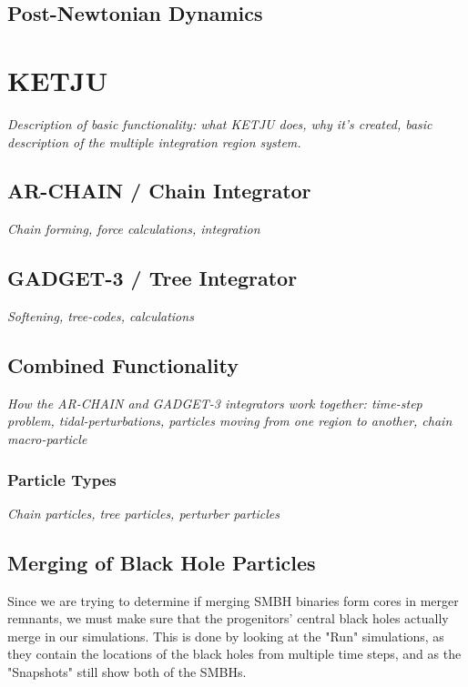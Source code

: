 \documentclass[english, oneside]{HYgradu}
\begin{document}
\section{Post-Newtonian Dynamics}

\chapter{KETJU}

\textit{Description of basic functionality: what KETJU does, why it's created, basic description of the multiple integration region system.} 

\section{AR-CHAIN / Chain Integrator}

\textit{Chain forming, force calculations, integration}

\section{GADGET-3 / Tree Integrator}

\textit{Softening, tree-codes, calculations}

\section{Combined Functionality}

\textit{How the AR-CHAIN and GADGET-3 integrators work together: time-step problem, tidal-perturbations, particles moving from one region to another, chain macro-particle}

\subsection{Particle Types}

\textit{Chain particles, tree particles, perturber particles}

\section{Merging of Black Hole Particles}

Since we are trying to determine if merging SMBH binaries form cores in merger remnants, we must make sure that the progenitors' central black holes actually merge in our simulations. This is done by looking at the "Run" simulations, as they contain the locations of the black holes from multiple time steps, and as the "Snapshots" still show both of the SMBHs.
\end{document}
